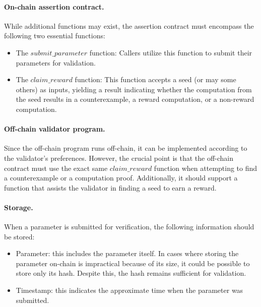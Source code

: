 \documentclass[runningheads]{llncs}
\begin{document}
\paragraph{On-chain assertion contract.}
While additional functions may exist, the assertion contract must encompass the following two essential functions:
\begin{itemize}
\item The \( submit\_parameter \) function: Callers utilize this function to submit their parameters for validation. %
\item  The \( claim\_reward \) function: This function accepts a seed (or may some others) as inputs, yielding a result indicating whether the computation from the seed results in a counterexample, a reward computation, or a non-reward computation.
\end{itemize}
\paragraph{Off-chain validator program.}
Since the off-chain program runs off-chain, it can be implemented according to the validator's preferences. However, the crucial point is that the off-chain contract must use the exact same \( claim\_reward \) function when attempting to find a counterexample or a computation proof. Additionally, it should support a function that assists the validator in finding a seed to earn a reward.
\paragraph{Storage.}
When a parameter is submitted for verification, the following information should be stored:
\begin{itemize}
\item Parameter: this includes the parameter itself. In cases where storing the parameter on-chain is impractical because of its size, it could be possible to store only its hash. Despite this, the hash remains sufficient for validation.
\item Timestamp: this indicates the approximate time when the parameter was submitted. %
\end{itemize}
\end{document}
